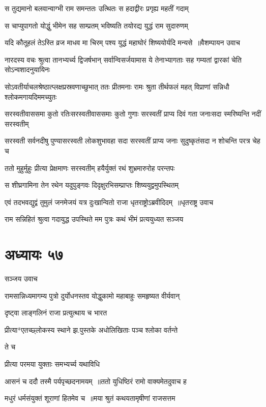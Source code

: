 \twolineshloka
{स तुद्यमानो बलवान्वाग्भी राम समन्ततः}
{उत्थितः स हदाद्वीरः प्रगृह्य महतीं गदाम्}


\twolineshloka
{स चाप्युपागतो योद्धुं भीमेन सह साम्प्रतम्}
{भविष्यति तयोरद्य युद्धं राम सुदारुणम्}


\threelineshloka
{यदि कौतूहलं तेऽस्ति व्रज माधव मा चिरम्}
{पश्य युद्धं महाघोरं शिष्ययोर्यदि मन्यसे ॥वैशम्पायन उवाच}
{}


\threelineshloka
{नारदस्य वचः श्रुत्वा तानभ्यर्च्य द्विजर्षभान्}
{सर्वान्विसर्जयामास ये तेनाभ्यागताः सह}
{गम्यतां द्वारकां चेति सोऽन्वशादनुयायिनः}


\threelineshloka
{सोऽवतीर्याचलश्रेष्ठात्प्लक्षप्रस्रवणाच्छुभात्}
{ततः प्रीतमनाः रामः श्रुता तीर्थफलं महत्}
{विप्राणां सन्निधौ श्लोकमगायदिममच्युतः}


\twolineshloka
{सरस्वतीवाससमा कुतो रतिःसरस्वतीवाससमाः कुतो गुणाः}
{सरस्वतीं प्राप्य दिवं गता जनाःसदा स्मरिष्यन्ति नदीं सरस्वतीम्}


\twolineshloka
{सरस्वती सर्वनदीषु पुण्यासरस्वती लोकशुभावहा सदा}
{सरस्वतीं प्राप्य जनाः सुदुष्कृतंसदा न शोचन्ति परत्र चेह च}


\twolineshloka
{ततो मुहुर्मुहुः प्रीत्या प्रेक्षमाणः सरस्वतीम्}
{हयैर्युक्तं रथं शुभ्रमारुरोह परन्तपः}


\twolineshloka
{स शीघ्रगामिना तेन रथेन यदुपुङ्गवः}
{दिदृक्षुरभिसम्प्राप्तः शिष्ययुद्वमुपस्थितम्}


\threelineshloka
{एवं तदभवद्युद्वं तुमुलं जनमेजयं}
{यत्र दुःखान्वितो राजा धृतराष्ट्रोऽब्रवीदिदम् ॥धृतराष्ट्र उवाच}
{}


\twolineshloka
{राम सन्निहितं श्रुत्वा गदायुद्ध उपस्थिते}
{मम पुत्रः कथं भीमं प्रत्ययुध्यत सञ्जय}


\chapter{अध्यायः ५७}
\twolineshloka
{सञ्जय उवाच}
{}


\twolineshloka
{रामसान्निध्यमागम्य पुत्रो दुर्योधनस्तव}
{योद्धुकामो महाबाहुः समहृष्यत वीर्यवान्}


दृष्ट्वा लाङ्गलिनं राजा प्रत्युत्थाय च भारत

प्रीत्या*एतच्छ्लोकस्य स्थाने झ.पुस्तके अधोलिखिताः पञ्च श्लोका वर्तन्ते

ते च

प्रीत्या परमया युक्ताः समभ्यर्च्य यथाविधि

आसनं च ददौ तस्मै पर्यपृच्छदनामयम् ॥ततो युधिष्ठिरं रामो वाक्यमेतदुवाच ह

मधुरं धर्मसंयुक्तं शूराणां हितमेव च ॥मया श्रुतं कथयतामृषीणां राजसत्तम

